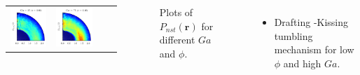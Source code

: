 \documentclass{sintefbeamer}
\begin{document}
\begin{frame}
\begin{columns}
\begin{tabular}{cccc}
        \includegraphics[height=0.3\textwidth]{image/HOMOGENEOUS/fDrop/Pnst_mu_r_0_1_Ga_25_PHI_0_05.pdf}&
        \includegraphics[height=0.3\textwidth]{image/HOMOGENEOUS/fDrop/Pnst_mu_r_0_1_Ga_75_PHI_0_05.pdf}\\
      \end{tabular}

      \begin{figure}
        \caption{Plots of $P_{nst} (\textbf{r})$ for different $Ga$ and $\phi$.}
      \end{figure}
    
    \begin{itemize}
      \item Drafting -Kissing tumbling mechanism for low $\phi$ and high $Ga$. 
    \end{itemize}
  \end{columns}
\end{frame}
\end{document}
